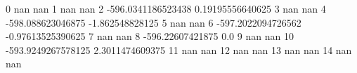 0 nan nan
1 nan nan
2 -596.0341186523438 0.19195556640625
3 nan nan
4 -598.088623046875 -1.862548828125
5 nan nan
6 -597.2022094726562 -0.97613525390625
7 nan nan
8 -596.22607421875 0.0
9 nan nan
10 -593.9249267578125 2.3011474609375
11 nan nan
12 nan nan
13 nan nan
14 nan nan
